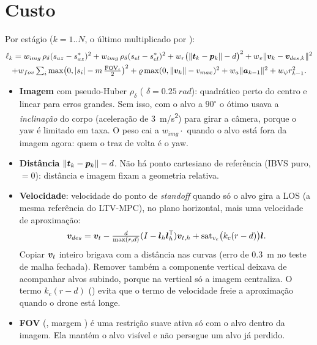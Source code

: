\section{Custo}
Por estágio ($k=1..N$, o último multiplicado por ):
\begin{multline}
  \ell_k = w_{img}\,\rho_\delta(s_{az}-s_{az}^*)^2+w_{img}\,\rho_\delta(s_{el}-s_{el}^*)^2
  + w_r\big(\|\bm{t}_k-\bm{p}_k\|-d\big)^2 + w_v\|\bm{v}_k-\bm{v}_{des,k}\|^2\\
  + w_{fov}\textstyle\sum_i\max\!\big(0,|s_i|-m\,\tfrac{\mathrm{FOV}_i}{2}\big)^2
  + \varrho\max(0,\|\bm{v}_k\|-v_{max})^2 + w_a\|\bm{a}_{k-1}\|^2+w_\psi r_{k-1}^2 .
\end{multline}
\begin{itemize}
  \item \textbf{Imagem} com pseudo-Huber $\rho_\delta$ ( $\delta=\SI{0,25}{rad}$):
        quadrático perto do centro e linear para erros grandes. Sem isso, com o alvo a $90^\circ$ o
        ótimo usava a \emph{inclinação} do corpo (aceleração de \SI{3}{m/s^2}) para girar a câmera,
        porque o yaw é limitado em taxa. O peso cai a $w_{img}\cdot$ quando o
        alvo está fora da imagem agora: quem o traz de volta é o yaw.
  \item \textbf{Distância} $\|\bm{t}_k-\bm{p}_k\|-d$. Não há ponto cartesiano de referência
        (IBVS puro, $=0$): distância e imagem fixam a geometria relativa.
  \item \textbf{Velocidade}: velocidade do ponto de \emph{standoff} quando só o alvo gira a LOS
        (a mesma referência do LTV-MPC), no plano horizontal, mais uma velocidade de aproximação:
        \begin{equation}
          \bm{v}_{des}=\bm{v}_t-\tfrac{d}{\max(r,d)}(I-\bm{l}_h\bm{l}_h^{\mathsf{T}})\bm{v}_{t,h}
          +\operatorname{sat}_{v_c}\!\big(k_c(r-d)\big)\bm{l} .
        \end{equation}
        Copiar $\bm{v}_t$ inteiro brigava com a distância nas curvas (erro de \SI{0,3}{m} no teste de
        malha fechada). Remover também a componente vertical deixava de acompanhar alvos subindo,
        porque na vertical só a imagem centraliza. O termo $k_c(r-d)$ () evita
        que o termo de velocidade freie a aproximação quando o drone está longe.
  \item \textbf{FOV} (, margem ) é uma restrição suave
        ativa só com o alvo dentro da imagem. Ela mantém o alvo visível e não persegue um alvo já perdido.
\end{itemize}

